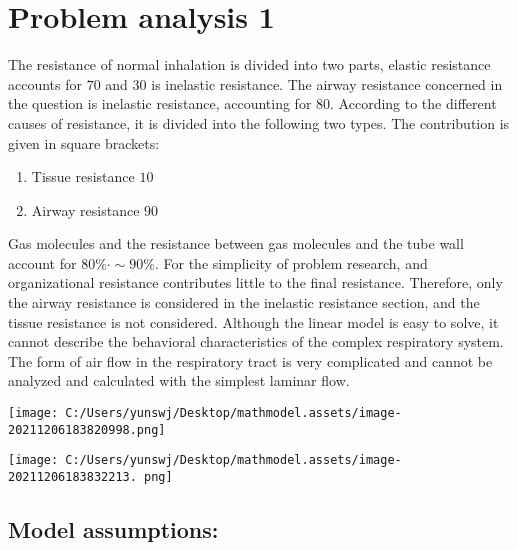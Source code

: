 \documentclass[
]{article}
\author{}
\date{}
\begin{document}
\hypertarget{problem-analysis-1}{%
\section{\texorpdfstring{Problem analysis 1
}{Problem analysis 1 }}\label{problem-analysis-1}}

The resistance of normal inhalation is divided into two parts, elastic
resistance accounts for \(70%
\) and \(30%
\) is inelastic resistance. The airway resistance concerned in the
question is inelastic resistance, accounting for \(80%
\). According to the different causes of resistance, it is divided into
the following two types. The contribution is given in square brackets:

\begin{enumerate}
\def\labelenumi{\arabic{enumi}.}
\item
  Tissue resistance \(10%
  \)
\item
  Airway resistance \(90%
  \)
\end{enumerate}

Gas molecules and the resistance between gas molecules and the tube wall
account for \(80\% ·\sim 90\%%
\). For the simplicity of problem research, and organizational
resistance contributes little to the final resistance. Therefore, only
the airway resistance is considered in the inelastic resistance section,
and the tissue resistance is not considered. Although the linear model
is easy to solve, it cannot describe the behavioral characteristics of
the complex respiratory system. The form of air flow in the respiratory
tract is very complicated and cannot be analyzed and calculated with the
simplest laminar flow.

\texttt{[image: C:/Users/yunswj/Desktop/mathmodel.assets/image-20211206183820998.png]}

\texttt{[image: C:/Users/yunswj/Desktop/mathmodel.assets/image-20211206183832213. png]}

\hypertarget{model-assumptions}{%
\subsection{\texorpdfstring{Model assumptions:
}{Model assumptions: }}\label{model-assumptions}}
\end{document}
